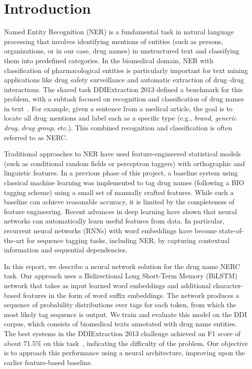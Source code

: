 \section{Introduction}
Named Entity Recognition (NER) is a fundamental task in natural language processing that involves identifying mentions of entities (such as persons, organizations, or in our case, drug names) in unstructured text and classifying them into predefined categories. In the biomedical domain, NER with classification of pharmacological entities is particularly important for text mining applications like drug safety surveillance and automatic extraction of drug--drug interactions. The shared task DDIExtraction 2013 defined a benchmark for this problem, with a subtask focused on recognition and classification of drug names in text~\cite{semeval2013}. For example, given a sentence from a medical article, the goal is to locate all drug mentions and label each as a specific type (e.g., \emph{brand}, \emph{generic drug}, \emph{drug group}, etc.). This combined recognition and classification is often referred to as NERC.

Traditional approaches to NER have used feature-engineered statistical models (such as conditional random fields or perceptron taggers) with orthographic and linguistic features. In a previous phase of this project, a baseline system using classical machine learning was implemented to tag drug names (following a BIO tagging scheme) using a small set of manually crafted features. While such a baseline can achieve reasonable accuracy, it is limited by the completeness of feature engineering. Recent advances in deep learning have shown that neural networks can automatically learn useful features from data. In particular, recurrent neural networks (RNNs) with word embeddings have become state-of-the-art for sequence tagging tasks, including NER, by capturing contextual information and sequential dependencies.

In this report, we describe a neural network solution for the drug name NERC task. Our approach uses a Bidirectional Long Short-Term Memory (BiLSTM) network that takes as input learned word embeddings and additional character-based features in the form of word suffix embeddings. The network produces a sequence of probability distributions over tags for each token, from which the most likely tag sequence is output. We train and evaluate this model on the DDI corpus, which consists of biomedical texts annotated with drug name entities. The best systems in the DDIExtraction 2013 challenge achieved an F1 score of about 71.5\% on this task~\cite{semeval2013}, indicating the difficulty of the problem. Our objective is to approach this performance using a neural architecture, improving upon the earlier feature-based baseline.

